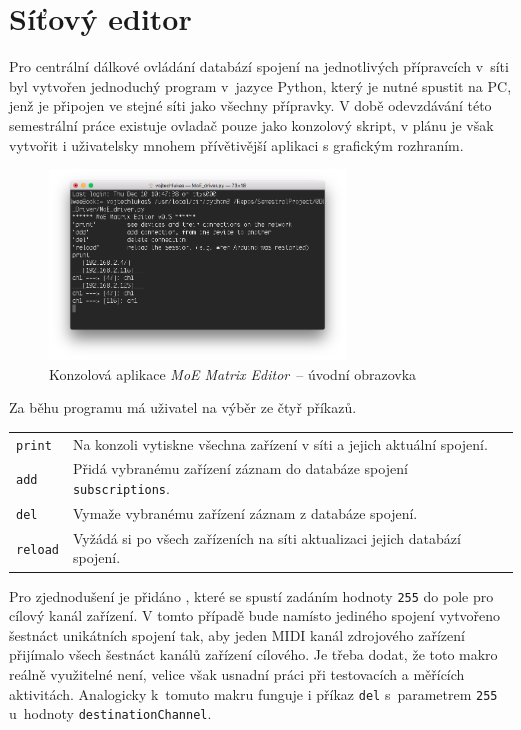 \chapter{Síťový editor}\label{chpt:MatrixEditor}
Pro centrální dálkové ovládání databází spojení na jednotlivých přípravcích v~síti byl vytvořen jednoduchý program v~jazyce Python, který je nutné spustit na PC, jenž je připojen ve stejné síti jako všechny přípravky. V době odevzdávání této semestrální práce existuje ovladač pouze jako konzolový skript, v plánu je však vytvořit i uživatelsky mnohem přívětivější aplikaci s grafickým rozhraním.

\begin{figure}[h]
    \centering
    \includegraphics[width=0.7\textwidth]{obrazky/MoE_editor_1.png}
    \caption{Konzolová aplikace \emph{MoE Matrix Editor}~-- úvodní obrazovka}
    \label{fig:Driver_1}
\end{figure}

Za běhu programu má uživatel na výběr ze čtyř příkazů.
\begin{table}[h]
    \centering
        \begin{tabular}{l p{}}
            \texttt{print} & Na konzoli vytiskne všechna zařízení v síti a jejich aktuální spojení. \\
            \texttt{add} & Přidá vybranému zařízení záznam do databáze spojení \texttt{subscriptions}. \\
            \texttt{del} & Vymaže vybranému zařízení záznam z databáze spojení. \\
            \texttt{reload} & Vyžádá si po všech zařízeních na síti aktualizaci jejich databází spojení. \\
        \end{tabular}
\end{table}

Pro zjednodušení je přidáno , které se spustí zadáním hodnoty \texttt{255} do pole pro cílový kanál zařízení. V tomto případě bude namísto jediného spojení vytvořeno šestnáct unikátních spojení tak, aby jeden \acs{MIDI} kanál zdrojového zařízení přijímalo všech šestnáct kanálů zařízení cílového. Je třeba dodat, že toto makro reálně využitelné není, velice však usnadní práci při testovacích a měřících aktivitách. Analogicky k~tomuto makru funguje i příkaz \texttt{del} s~parametrem \texttt{255} u~hodnoty \texttt{destinationChannel}.

